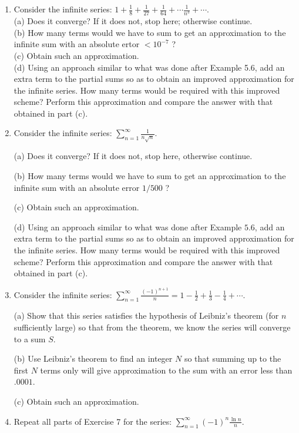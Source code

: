\documentclass[../main.tex]{subfiles}
\begin{document}
\begin{enumerate}
\item Consider the infinite series: $1+\frac{1}{8}+\frac{1}{27}+\frac{1}{64}+\cdots \frac{1}{n^{3}}+\cdots$.\\
(a) Does it converge? If it does not, stop here; otherwise continue.\\
(b) How many terms would we have to sum to get an approximation to the infinite sum with an absolute ertor $<10^{-7}$ ?\\
(c) Obtain such an approximation.\\
(d) Using an approach similar to what was done after Example 5.6, add an extra term to the partial sums so as to obtain an improved approximation for the infinite series. How many terms would be required with this improved scheme? Perform this approximation and compare the answer with that obtained in part (c).

\item Consider the infinite series: $\sum_{n=1}^{\infty} \frac{1}{n \sqrt{n}}$.

(a) Does it converge? If it does not, stop here, otherwise continue.

(b) How many terms would we have to sum to get an approximation to the infinite sum with an absolute error $1 / 500$ ?

(c) Obtain such an approximation.

(d) Using an approach similar to what was done after Example $5.6$, add an extra term to the partial sums so as to obtain an improved approximation for the infinite series. How many terms would be required with this improved scheme? Perform this approximation and compare the answer with that obtained in part (c).

\item Consider the infinite series: $\sum_{n=1}^{\infty} \frac{(-1)^{n+1}}{n}=1-\frac{1}{2}+\frac{1}{3}-\frac{1}{4}+\cdots$.

(a) Show that this series satisfies the hypothesis of Leibniz's theorem (for $n$ sufficiently large) so that from the theorem, we know the series will converge to a sum $S$.

(b) Use Leibniz's theorem to find an integer $N$ so that summing up to the first $N$ terms only will give approximation to the sum with an error less than $.0001$.

(c) Obtain such an approximation.

\item Repeat all parts of Exercise 7 for the series: $\sum_{n=1}^{\infty}(-1)^{n} \frac{\ln n}{n}$.


\end{enumerate}
\end{document}
